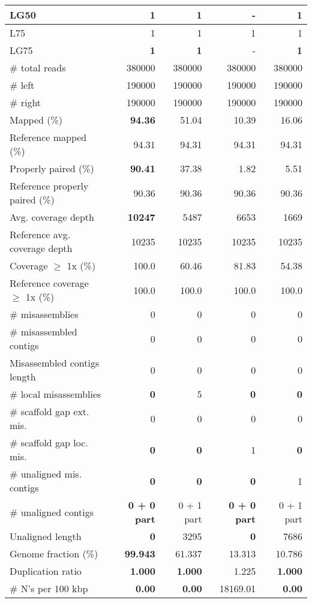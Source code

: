 \documentclass[12pt,a4paper]{article}
\begin{document}
\begin{table}[ht]
\begin{center}
\begin{tabular}{|l*{4}{|r}|}
LG50 & {\bf 1} & {\bf 1} & - & {\bf 1} \\ \hline
L75 & 1 & 1 & 1 & 1 \\ \hline
LG75 & {\bf 1} & {\bf 1} & - & {\bf 1} \\ \hline
\# total reads & 380000 & 380000 & 380000 & 380000 \\ \hline
\# left & 190000 & 190000 & 190000 & 190000 \\ \hline
\# right & 190000 & 190000 & 190000 & 190000 \\ \hline
Mapped (\%) & {\bf 94.36} & 51.04 & 10.39 & 16.06 \\ \hline
Reference mapped (\%) & 94.31 & 94.31 & 94.31 & 94.31 \\ \hline
Properly paired (\%) & {\bf 90.41} & 37.38 & 1.82 & 5.51 \\ \hline
Reference properly paired (\%) & 90.36 & 90.36 & 90.36 & 90.36 \\ \hline
Avg. coverage depth & {\bf 10247} & 5487 & 6653 & 1669 \\ \hline
Reference avg. coverage depth & 10235 & 10235 & 10235 & 10235 \\ \hline
Coverage $\geq$ 1x (\%) & 100.0 & 60.46 & 81.83 & 54.38 \\ \hline
Reference coverage $\geq$ 1x (\%) & 100.0 & 100.0 & 100.0 & 100.0 \\ \hline
\# misassemblies & 0 & 0 & 0 & 0 \\ \hline
\# misassembled contigs & 0 & 0 & 0 & 0 \\ \hline
Misassembled contigs length & 0 & 0 & 0 & 0 \\ \hline
\# local misassemblies & {\bf 0} & 5 & {\bf 0} & {\bf 0} \\ \hline
\# scaffold gap ext. mis. & 0 & 0 & 0 & 0 \\ \hline
\# scaffold gap loc. mis. & {\bf 0} & {\bf 0} & 1 & {\bf 0} \\ \hline
\# unaligned mis. contigs & {\bf 0} & {\bf 0} & {\bf 0} & 1 \\ \hline
\# unaligned contigs & {\bf 0 + 0 part} & 0 + 1 part & {\bf 0 + 0 part} & 0 + 1 part \\ \hline
Unaligned length & {\bf 0} & 3295 & {\bf 0} & 7686 \\ \hline
Genome fraction (\%) & {\bf 99.943} & 61.337 & 13.313 & 10.786 \\ \hline
Duplication ratio & {\bf 1.000} & {\bf 1.000} & 1.225 & {\bf 1.000} \\ \hline
\# N's per 100 kbp & {\bf 0.00} & {\bf 0.00} & 18169.01 & {\bf 0.00} \\ \hline

\end{tabular}
\end{center}
\end{table}
\end{document}
